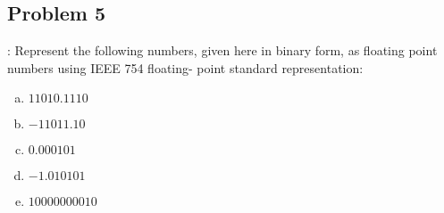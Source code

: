 \documentclass{../slides}
\begin{document}
\subsection{Problem 5}
\begin{frame}{\secname: \subsecname}
    Represent the following numbers, given here in binary form, as floating point numbers using IEEE 754 floating- point standard representation:
    \begin{enumerate}[(a)]
        \item $11010.1110$
        \item $-11011.10$
        \item $0.000101$
        \item $-1.010101$
        \item $10000000010$
    \end{enumerate}
\end{frame}
\end{document}
